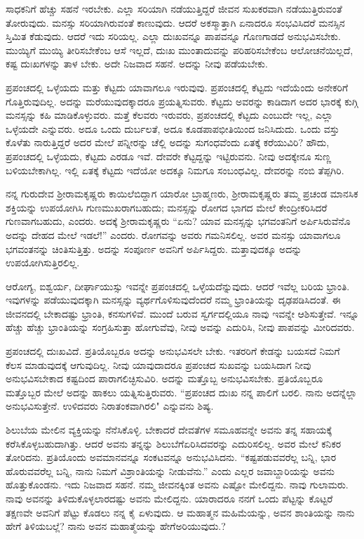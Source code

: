 ಸಾಧಕನಿಗೆ ಹೆಚ್ಚು ಸಹನೆ ಇರಬೇಕು. ಎಲ್ಲಾ ಸರಿಯಾಗಿ ನಡೆಯುತ್ತಿದ್ದರೆ ಜೀವನ ಸುಖಕರವಾಗಿ ನಡೆಯುತ್ತಿರುವಂತೆ ತೋರುವುದು. ಮನಸ್ಸು ಸರಿಯಾಗಿರುವಂತೆ ಕಾಣುವುದು. ಆದರೆ ಅಕಸ್ಮಾತ್ತಾಗಿ ಏನಾದರೂ ಸಂಭವಿಸಿದರೆ ಮನಸ್ಸಿನ ಸ್ತಿಮಿತ ಕೆಡುವುದು. ಆದರೆ ಇದು ಸರಿಯಲ್ಲ. ಎಲ್ಲಾ ದುಃಖವನ್ನೂ ಪಾಪವನ್ನೂ ಗೊಣಗಾಡದೆ ಅನುಭವಿಸಬೇಕು. ಮುಯ್ಯಿಗೆ ಮುಯ್ಯಿ ತೀರಿಸಬೇಕೆಂಬ ಆಸೆ ಇಲ್ಲದೆ, ದುಃಖ ಮುಂತಾದುವನ್ನು ಪರಿಹರಿಸಬೇಕೆಂಬ ಆಲೋಚನೆಯಿಲ್ಲದೆ, ಕಷ್ಟ ದುಃಖಗಳನ್ನು ತಾಳ ಬೇಕು. ಅದೇ ನಿಜವಾದ ಸಹನೆ. ಅದನ್ನು ನೀವು ಪಡೆಯಬೇಕು.

ಪ್ರಪಂಚದಲ್ಲಿ ಒಳ್ಳೆಯದು ಮತ್ತು ಕೆಟ್ಟದು ಯಾವಾಗಲೂ ಇರುವುವು. ಪ್ರಪಂಚದಲ್ಲಿ ಕೆಟ್ಟದು ಇದೆಯೆಂದು ಅನೇಕರಿಗೆ ಗೊತ್ತಿರುವುದಿಲ್ಲ. ಅದನ್ನು ಮರೆಯುವುದಕ್ಕಾದರೂ ಪ್ರಯತ್ನಿಸುವರು. ಕೆಟ್ಟದು ಅವರನ್ನು ಕಾಡಿದಾಗ ಅದರ ಭಾರಕ್ಕೆ ಕುಗ್ಗಿ ಮನಸ್ಸನ್ನು ಕಹಿ ಮಾಡಿಕೊಳ್ಳುವರು. ಮತ್ತೆ ಕೆಲವರು ಇರುವರು, ಪ್ರಪಂಚದಲ್ಲಿ ಕೆಟ್ಟದು ಎಂಬುದೇ ಇಲ್ಲ, ಎಲ್ಲಾ ಒಳ್ಳೆಯದೇ ಎನ್ನುವರು. ಅದೂ ಒಂದು ದುರ್ಬಲತೆ, ಅದೂ ಕೂಡ\break ಪಾಪಭೀತಿಯಿಂದ ಜನಿಸಿದುದು. ಒಂದು ವಸ್ತು ಕೊಳೆತು ನಾರುತ್ತಿದ್ದರೆ ಅದರ ಮೇಲೆ ಪನ್ನೀರನ್ನು ಚೆಲ್ಲಿ ಅದನ್ನು ಸುಗಂಧವೆಂದು ಏತಕ್ಕೆ ಕರೆಯುವಿರಿ? ಹೌದು, ಪ್ರಪಂಚದಲ್ಲಿ ಒಳ್ಳೆಯದು, ಕೆಟ್ಟದು ಎರಡೂ ಇವೆ. ದೇವರೇ ಕೆಟ್ಟದ್ದನ್ನು ಇಟ್ಟಿರುವನು. ನೀವು ಅದಕ್ಕೇನೂ ಸುಣ್ಣ ಬಳಿಯಬೇಕಾಗಿಲ್ಲ. ಇಲ್ಲಿ ಏತಕ್ಕೆ ಕೆಟ್ಟದು ಇದೆಯೋ ಅದಕ್ಕೂ ನಿಮಗೂ ಸಂಬಂಧವಿಲ್ಲ. ದೇವರನ್ನು ನಂಬಿ ತೆಪ್ಪಗಿರಿ.

ನನ್ನ ಗುರುದೇವ ಶ‍್ರೀರಾಮಕೃಷ್ಣರು ಕಾಯಿಲೆಬಿದ್ದಾಗ ಯಾರೋ ಬ್ರಾಹ್ಮಣರು, ಶ‍್ರೀರಾಮಕೃಷ್ಣರು ತಮ್ಮ ಪ್ರಚಂಡ ಮಾನಸಿಕ ಶಕ್ತಿಯನ್ನು ಉಪಯೋಗಿಸಿ ಗುಣಮುಖರಾಗಬಹುದು; ಮನಸ್ಸನ್ನು ರೋಗದ ಭಾಗದ ಮೇಲೆ ಕೇಂದ್ರೀಕರಿಸಿದರೆ ಗುಣವಾಗಬಹುದು, ಎಂದರು. ಅದಕ್ಕೆ ಶ‍್ರೀರಾಮಕೃಷ್ಣರು “ಏನು? ಯಾವ ಮನಸ್ಸನ್ನು ಭಗವಂತನಿಗೆ ಅರ್ಪಿಸಿರುವೆನೊ ಅದನ್ನು ದೇಹದ ಮೇಲೆ ಇಡಲೆ!'' ಎಂದರು. ರೋಗವನ್ನು ಅವರು ಗಮನಿಸಲಿಲ್ಲ. ಅವರ ಮನಸ್ಸು ಯಾವಾಗಲೂ ಭಗವಂತನನ್ನು ಚಿಂತಿಸುತ್ತಿತ್ತು. ಅದನ್ನು ಸಂಪೂರ್ಣ ಅವನಿಗೆ ಅರ್ಪಿಸಿದ್ದರು. ಮತ್ತಾವುದಕ್ಕೂ ಅದನ್ನು ಉಪಯೋಗಿಸುತ್ತಿರಲಿಲ್ಲ.

ಆರೋಗ್ಯ, ಐಶ್ವರ್ಯ, ದೀರ್ಘಾಯುಸ್ಸು ಇವನ್ನೇ ಪ್ರಪಂಚದಲ್ಲಿ ಒಳ್ಳೆಯದೆನ್ನುವುದು. ಆದರೆ ಇವೆಲ್ಲ ಬರಿಯ ಭ್ರಾಂತಿ. ಇವುಗಳನ್ನು ಪಡೆಯುವುದಕ್ಕಾಗಿ ಮನಸ್ಸನ್ನು ವ್ಯರ್ಥಗೊಳಿಸುವುದೆಂದರೆ ನಮ್ಮ ಭ್ರಾಂತಿಯನ್ನು ದೃಢಪಡಿಸಿದಂತೆ. ಈ ಜೀವನದಲ್ಲಿ ಬೇಕಾದಷ್ಟು ಭ್ರಾಂತಿ, ಕನಸುಗಳಿವೆ. ಮುಂದೆ ಬರುವ ಸ್ವರ್ಗದಲ್ಲಿಯೂ ನಾವು ಇವನ್ನೇ ಆಶಿಸುತ್ತೇವೆ. ಇನ್ನೂ ಹೆಚ್ಚು ಹೆಚ್ಚು ಭ್ರಾಂತಿಯನ್ನು ಸಂಗ್ರಹಿಸುತ್ತಾ ಹೋಗುವೆವು, ನೀವು ಅವನ್ನು ಎದುರಿಸಿ, ನೀವು ಪಾಪವನ್ನು ಮೀರಿದವರು.

ಪ್ರಪಂಚದಲ್ಲಿ ದುಃಖವಿದೆ. ಪ್ರತಿಯೊಬ್ಬರೂ ಅದನ್ನು ಅನುಭವಿಸಲೇ ಬೇಕು. ಇತರರಿಗೆ ಕೇಡನ್ನು ಬಯಸದೆ ನಿಮಗೆ ಕೆಲಸ ಮಾಡುವುದಕ್ಕೆ ಆಗುವುದಿಲ್ಲ. ನೀವು ಯಾವುದಾದರೂ ಪ್ರಪಂಚದ ಸುಖವನ್ನು ಬಯಸಿದಾಗ ನೀವು ಅನುಭವಿಸಬೇಕಾದ ಕಷ್ಟದಿಂದ ಪಾರಾಗಲಿಚ್ಛಿಸುವಿರಿ. ಅದನ್ನು ಮತ್ತೊಬ್ಬ ಅನುಭವಿಸಬೇಕು. ಪ್ರತಿಯೊಬ್ಬರೂ ಮತ್ತೊಬ್ಬರ ಮೇಲೆ ಅದನ್ನು ಹಾಕಲು ಯತ್ನಿಸುತ್ತಿರುವರು. “ಪ್ರಪಂಚದ ದುಃಖ ನನ್ನ ಪಾಲಿಗೆ ಬರಲಿ. ನಾನು ಅದನ್ನೆಲ್ಲಾ ಅನುಭವಿಸುತ್ತೇನೆ. ಉಳಿದವರು ನಿರಾತಂಕವಾಗಿರಲಿ" ಎನ್ನುವನು ಶಿಷ್ಯ.

ಶಿಲುಬೆಯ ಮೇಲಿನ ವ್ಯಕ್ತಿಯನ್ನು ನೆನೆಸಿಕೊಳ್ಳಿ. ಬೇಕಾದರೆ ದೇವತೆಗಳ ಸಮೂಹವನ್ನೇ ಅವನು ತನ್ನ ಸಹಾಯಕ್ಕೆ ಕರೆಸಿಕೊಳ್ಳಬಹುದಾಗಿತ್ತು. ಆದರೆ ಅವನು ತನ್ನನ್ನು ಶಿಲುಬೆಗೆ\break ಏರಿಸಿದವರನ್ನು ಎದುರಿಸಲಿಲ್ಲ. ಅವರ ಮೇಲೆ ಕನಿಕರ ತೋರಿದನು. ಪ್ರತಿಯೊಂದು ಅವಮಾನವನ್ನೂ ಸಂಕಟವನ್ನೂ ಅನುಭವಿಸಿದನು. “ಕಷ್ಟಪಡುವವರೆಲ್ಲ ಬನ್ನಿ, ಭಾರ ಹೊರುವವರೆಲ್ಲ ಬನ್ನಿ, ನಾನು ನಿಮಗೆ ವಿಶ್ರಾಂತಿಯನ್ನು ನೀಡುವೆನು.” ಎಂದು ಎಲ್ಲರ ಜವಾಬ್ದಾರಿಯನ್ನು ಅವನು ಹೊತ್ತುಕೊಂಡನು. ಇದು ನಿಜವಾದ ಸಹನೆ. ನಮ್ಮ ಜೀವನಕ್ಕಿಂತ ಅವನು ಎಷ್ಟೋ ಮೇಲಿದ್ದನು. ನಾವು ಗುಲಾಮರು. ನಾವು ಅವನನ್ನು ತಿಳಿದುಕೊಳ್ಳಲಾರದಷ್ಟು ಅವನು ಮೇಲಿದ್ದನು. ಯಾರಾದರೂ ನನಗೆ ಒಂದು ಪೆಟ್ಟನ್ನು ಕೊಟ್ಟರೆ ತಕ್ಷಣವೇ ಅವನಿಗೆ ಪೆಟ್ಟು ಕೊಡಲು ನನ್ನ ಕೈ ಏಳುವುದು. ಆ ಮಹಾತ್ಮನ ಮಹಿಮೆಯನ್ನು, ಅವನ ಶಾಂತಿಯನ್ನು ನಾನು ಹೇಗೆ ತಿಳಿಯಬಲ್ಲೆ? ನಾನು ಅವನ ಮಹಾತ್ಮೆಯನ್ನು ಹೇಗೆ\break ಅರಿಯುವುದು.?

